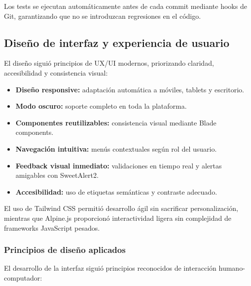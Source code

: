 Los tests se ejecutan automáticamente antes de cada commit mediante hooks de Git, garantizando que no se introduzcan regresiones en el código.

\subsection{Diseño de interfaz y experiencia de usuario}

El diseño siguió principios de UX/UI modernos, priorizando claridad, accesibilidad y consistencia visual:

\begin{itemize}
    \item \textbf{Diseño responsive:} adaptación automática a móviles, tablets y escritorio.
    \item \textbf{Modo oscuro:} soporte completo en toda la plataforma.
    \item \textbf{Componentes reutilizables:} consistencia visual mediante Blade components.
    \item \textbf{Navegación intuitiva:} menús contextuales según rol del usuario.
    \item \textbf{Feedback visual inmediato:} validaciones en tiempo real y alertas amigables con SweetAlert2.
    \item \textbf{Accesibilidad:} uso de etiquetas semánticas y contraste adecuado.
\end{itemize}

El uso de Tailwind CSS permitió desarrollo ágil sin sacrificar personalización, mientras que Alpine.js proporcionó interactividad ligera sin complejidad de frameworks JavaScript pesados.

\subsubsection{Principios de diseño aplicados}

El desarrollo de la interfaz siguió principios reconocidos de interacción humano-computador:

